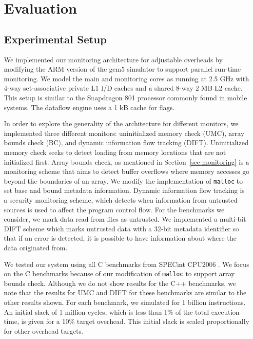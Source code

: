 \section{Evaluation}
\label{sec:evaluation}

\subsection{Experimental Setup}
\label{sec:evaluation.setup}

We implemented our monitoring architecture for adjustable overheads by
modifying the ARM version of the gem5 simulator \cite{gem5} to support parallel
run-time monitoring. We model the main and monitoring cores as running at 2.5
GHz with 4-way set-associative private L1 I/D caches and a shared 8-way 2 MB L2
cache. This setup is similar to the Snapdragon 801 processor commonly found in
mobile systems. The dataflow engine uses a 1 kB cache for flags.

In order to explore the generality of the architecture for
different monitors, we implemented three different monitors: uninitialized
memory check (UMC), array bounds check (BC), and dynamic information flow
tracking (DIFT).  Uninitialized memory check seeks to detect loading from
memory locations that are not initialized first.  Array bounds check, as
mentioned in Section~\ref{sec:monitoring} is a monitoring scheme that aims to
detect buffer overflows where memory accesses go beyond the boundaries of an
array. We modify the implementation of {\tt malloc} to set base and bound
metadata information. Dynamic information flow tracking is a security
monitoring scheme,
which detects when information from untrusted sources is used to affect the
program control flow. For the benchmarks we consider, we mark data read from
files as untrusted. We implemented a multi-bit DIFT scheme which marks
untrusted data with a 32-bit metadata identifier so
that if an error is detected, it is possible to have information about where
the data originated from. 

We tested our system using all C benchmarks from SPECint
CPU2006 \cite{spec2006}. We focus on the C benchmarks because of our
modification of {\tt malloc} to support array bounds check. Although we do not
show results for the C++ benchmarks, we note that the results for UMC and DIFT
for these benchmarks are similar to the other results shown. For each
benchmark, we simulated for 1 billion instructions. An initial slack of 1
million cycles, which is less than 1\% of
the total execution time, is given for a 10\% target overhead. This initial
slack is scaled proportionally for other overhead targets.

